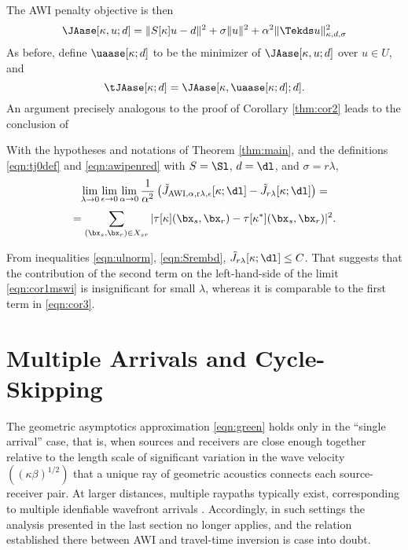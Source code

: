 The AWI penalty objective is then
\begin{equation}
  \label{eqn:awipen}
  \JAase[\kappa,u;d] = \|S[\kappa]u-d\|^2 + \sigma\|u\|^2 + \alpha^2
  \|\Tekds u\|_{\kappa,d,\sigma}^2
\end{equation}
As before, define $\uaase[\kappa;d]$ to be the minimizer of
$\JAase[\kappa,u;d]$ over $u \in U$, and
\begin{equation}
  \label{eqn:awipenred}
  \tJAase[\kappa;d] =\JAase[\kappa,\uaase[\kappa;d];d].
\end{equation}
An argument precisely analogous to the proof of Corollary
\ref{thm:cor2} leads to the conclusion of
\begin{cor}
  \label{thm:cor3}
  With the hypotheses and notations of Theorem \ref{thm:main}, and the
  definitions \ref{eqn:tj0def} and \ref{eqn:awipenred} with $S=\Sl$,
  $d=\dl$, and $\sigma=r\lambda$,
  \[
  \lim_{\lambda \rightarrow 0}\lim_{\epsilon \rightarrow 0}\lim_{\alpha \rightarrow 0}
  \frac{1}{\alpha^2}\left(\tilde{J}_{\rm AWI,\alpha,r\lambda,\epsilon}[\kappa;\dl]-\tilde{J}_{r\lambda}[\kappa;\dl]\right)=
  \]
  \begin{equation}
    \label{eqn:cor3}
    = \sum_{(\bx_s,\bx_r) \in X_{sr}} |\tau[\kappa](\bx_s,\bx_r) - \tau[\kappa^*](\bx_s,\bx_r)|^2.
  \end{equation}
\end{cor}

 From inequalities \ref{eqn:ulnorm},
\ref{eqn:Srembd}, $\tilde{J}_{r\lambda}[\kappa;\dl] \le C$. That
suggests that the contribution of the second term on the
left-hand-side of the limit \ref{eqn:cor1mswi} is insignificant for small
$\lambda$, whereas it is comparable to the first term in
\ref{eqn:cor3}. 



\section{Multiple Arrivals and Cycle-Skipping}
The geometric asymptotics approximation \ref{eqn:green} holds only
in the ``single arrival'' case, that is, when sources and receivers
are close enough together relative to the length scale of significant
variation in the wave velocity $((\kappa\beta)^{1/2})$ that a unique ray of
geometric acoustics connects each source-receiver pair. At larger
distances, multiple raypaths typically exist, corresponding to
multiple idenfiable wavefront arrivals \cite[]{Whi:82}. Accordingly, in such settings
the analysis presented in the last section no longer applies, and the
relation established there between AWI and travel-time inversion is
case into doubt.



